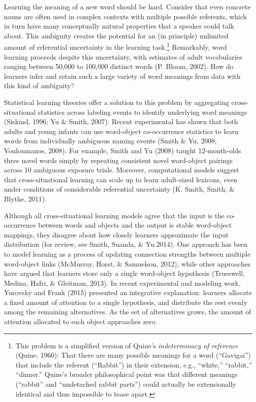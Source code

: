 \documentclass[authoryear, review]{elsarticle}
\begin{document}
Learning the meaning of a new word should be hard. Consider that even
concrete nouns are often used in complex contexts with multiple possible
referents, which in turn have many conceptually natural properties that
a speaker could talk about. This ambiguity creates the potential for an
(in principle) unlimited amount of referential uncertainty in the
learning task.\footnote{This problem is a simplified version of Quine's
  \textit{indeterminacy of reference} (Quine, 1960): That there are many
  possible meanings for a word (``Gavigai'') that include the referent
  (``Rabbit'') in their extension, e.g., ``white,'' ``rabbit,''
  ``dinner.'' Quine's broader philosophical point was that different
  meanings (``rabbit'' and ``undetached rabbit parts'') could actually
  be extensionally identical and thus impossible to tease apart.}
Remarkably, word learning proceeds despite this uncertainty, with
estimates of adult vocabularies ranging between 50,000 to 100,000
distinct words (P. Bloom, 2002). How do learners infer and retain such a
large variety of word meanings from data with this kind of ambiguity?

Statistical learning theories offer a solution to this problem by
aggregating cross-situational statistics across labeling events to
identify underlying word meanings (Siskind, 1996; Yu \& Smith, 2007).
Recent experimental has shown that both adults and young infants can use
word-object co-occurrence statistics to learn words from individually
ambiguous naming events (Smith \& Yu, 2008; Vouloumanos, 2008). For
example, Smith and Yu (2008) taught 12-month-olds three novel words
simply by repeating consistent novel word-object pairings across 10
ambiguous exposure trials. Moreover, computational models suggest that
cross-situational learning can scale up to learn adult-sized lexicons,
even under conditions of considerable referential uncertainty (K. Smith,
Smith, \& Blythe, 2011).

Although all cross-situational learning models agree that the input is
the co-occurrence between words and objects and the output is stable
word-object mappings, they disagree about how closely learners
approximate the input distribution (for review, see Smith, Suanda, \& Yu
2014). One approach has been to model learning as a process of updating
connection strengths between multiple word-object links (McMurray,
Horst, \& Samuelson, 2012), while other approaches have argued that
learners store only a single word-object hypothesis (Trueswell, Medina,
Hafri, \& Gleitman, 2013). In recent experimental and modeling work,
Yurovsky and Frank (2015) presented an integrative explanation: learners
allocate a fixed amount of attention to a single hypothesis, and
distribute the rest evenly among the remaining alternatives. As the set
of alternatives grows, the amount of attention allocated to each object
approaches zero.
\end{document}
